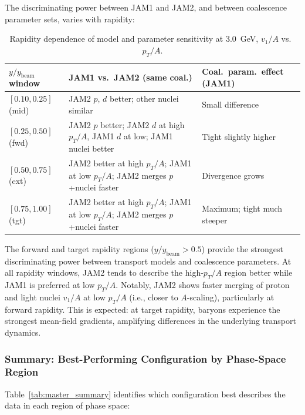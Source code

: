 \documentclass[aps,prc,preprint,superscriptaddress,nofootinbib]{revtex4-2}
\begin{document}
The discriminating power between JAM1 and JAM2, and between coalescence parameter sets, varies with rapidity:

\begin{table}[h]
\centering
\caption{Rapidity dependence of model and parameter sensitivity at 3.0~GeV, $v_1/A$ vs.\ $p_T/A$.}
\label{tab:rapidity_dependence}
\begin{tabular}{lp{5.5cm}p{4cm}}
\toprule
$y/y_{\text{beam}}$ window & JAM1 vs.\ JAM2 (same coal.) & Coal.\ param.\ effect (JAM1) \\
\midrule
$[0.10, 0.25]$ (mid) & JAM2 $p$, $d$ better; other nuclei similar & Small difference \\
$[0.25, 0.50]$ (fwd) & JAM2 $p$ better; JAM2 $d$ at high $p_T/A$, JAM1 $d$ at low; JAM1 nuclei better & Tight slightly higher \\
$[0.50, 0.75]$ (ext) & JAM2 better at high $p_T/A$; JAM1 at low $p_T/A$; JAM2 merges $p$+nuclei faster & Divergence grows \\
$[0.75, 1.00]$ (tgt) & JAM2 better at high $p_T/A$; JAM1 at low $p_T/A$; JAM2 merges $p$+nuclei faster & Maximum; tight much steeper \\
\bottomrule
\end{tabular}
\end{table}

The forward and target rapidity regions ($y/y_{\text{beam}} > 0.5$) provide the strongest discriminating power between transport models and coalescence parameters. At all rapidity windows, JAM2 tends to describe the high-$p_T/A$ region better while JAM1 is preferred at low $p_T/A$. Notably, JAM2 shows faster merging of proton and light nuclei $v_1/A$ at low $p_T/A$ (i.e., closer to $A$-scaling), particularly at forward rapidity. This is expected: at target rapidity, baryons experience the strongest mean-field gradients, amplifying differences in the underlying transport dynamics.

\subsubsection{Summary: Best-Performing Configuration by Phase-Space Region}

Table~\ref{tab:master_summary} identifies which configuration best describes the data in each region of phase space:
\end{document}
